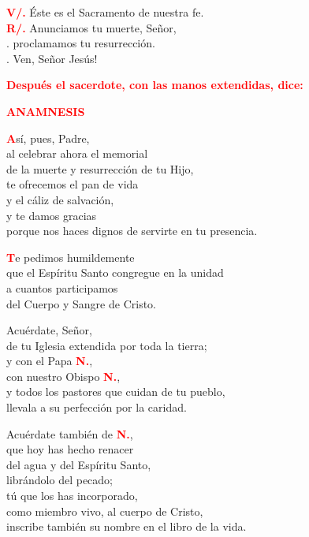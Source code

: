 \documentclass[12pt, letterpaper]{report}
\begin{document}
\noindent
\Large {\bfseries \textcolor{red}{V/.}} \hspace{0.5cm} \'Este es el Sacramento de nuestra fe.\\
\Large {\bfseries \textcolor{red}{R/.}} \hspace{0.5cm} Anunciamos tu muerte, Se\~nor,\\
. \hspace{1.5cm} proclamamos tu resurrecci\'on.\\
. \hspace{1.5cm} Ven, Se\~nor Jes\'us!\newline

\large{\bfseries \textcolor{red}{Despu\'es el sacerdote, con las manos extendidas, dice:}} \newline


\Large {\bfseries \textcolor{red}{ANAMNESIS}}

\lettrine[lines=1]{\bfseries \textcolor{red}{A}}{}\Large s\'i, pues, Padre,\\
al celebrar ahora el memorial\\
de la muerte y resurrecci\'on de tu Hijo,\\
te ofrecemos el pan de vida \\
y el c\'aliz de salvaci\'on,\\
y te damos gracias\\
porque nos haces dignos de servirte en tu presencia.

\lettrine[lines=1]{\bfseries \textcolor{red}{T}}{}\Large e pedimos humildemente\\
que el Esp\'iritu Santo congregue en la unidad\\
a cuantos participamos\\
del Cuerpo y Sangre de Cristo.\newline

Acu\'erdate, Se\~nor,\\
de tu Iglesia extendida por toda la tierra; \\
y con el Papa {\bfseries \textcolor{red}{N.}},\\
con nuestro Obispo {\bfseries \textcolor{red}{N.}},\\
y todos los pastores que cuidan de tu pueblo,\\
llevala a su perfecci\'on por la caridad.\newline

Acu\'erdate tambi\'en de {\bfseries \textcolor{red}{N.}},\\
que hoy has hecho renacer \\
del agua y del Esp\'iritu Santo, \\
libr\'andolo del pecado; \\
t\'u que los has incorporado, \\
como miembro vivo, al cuerpo de Cristo, \\
inscribe tambi\'en su nombre en el libro de la vida.
\end{document}
